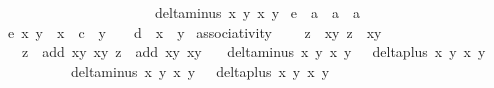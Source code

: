 \begin{isabellebody}
\ \ \ \ \ \ \ \ \ \ \ \ \ \ \ \ \ \ \ \ \ \ {\isacharparenleft}delta{\isacharunderscore}minus\ x{}\ y{}\ x{}\ y{}{\isacharparenright}{\isachardoublequoteclose}\isanewline
\isanewline
{}\isamarkupfalse%
\ e\ {\isacharcolon}{\isacharcolon}\ {\isachardoublequoteopen}{\isacharprime}a\ {\isasymRightarrow}\ {\isacharprime}a\ {\isasymRightarrow}\ {\isacharprime}a{\isachardoublequoteclose}\ \isanewline
\ {\isachardoublequoteopen}e\ x\ y\ {\isacharequal}\ x{\isacharcircum}{}\ {\isacharplus}\ c\ {\isacharasterisk}\ y{\isacharcircum}{}\ {\isacharminus}\ {}\ {\isacharminus}\ d\ {\isacharasterisk}\ x{\isacharcircum}{}\ {\isacharasterisk}\ y{\isacharcircum}{}{\isachardoublequoteclose}\isanewline
\isanewline
{}\isamarkupfalse%
\ associativity{\isacharcolon}\ \isanewline
\ \ \ {\isachardoublequoteopen}z{}{\isacharprime}\ {\isacharequal}\ {\isacharparenleft}x{}{\isacharprime}{\isacharcomma}y{}{\isacharprime}{\isacharparenright}{\isachardoublequoteclose}\ {\isachardoublequoteopen}z{}{\isacharprime}\ {\isacharequal}\ {\isacharparenleft}x{}{\isacharprime}{\isacharcomma}y{}{\isacharprime}{\isacharparenright}{\isachardoublequoteclose}\isanewline
\ \ \ {\isachardoublequoteopen}z{}{\isacharprime}\ {\isacharequal}\ add\ {\isacharparenleft}x{}{\isacharcomma}y{}{\isacharparenright}\ {\isacharparenleft}x{}{\isacharcomma}y{}{\isacharparenright}{\isachardoublequoteclose}\ {\isachardoublequoteopen}z{}{\isacharprime}\ {\isacharequal}\ add\ {\isacharparenleft}x{}{\isacharcomma}y{}{\isacharparenright}\ {\isacharparenleft}x{}{\isacharcomma}y{}{\isacharparenright}{\isachardoublequoteclose}\isanewline
\ \ \ {\isachardoublequoteopen}delta{\isacharunderscore}minus\ x{}\ y{}\ x{}\ y{}\ {\isasymnoteq}\ {}{\isachardoublequoteclose}\ {\isachardoublequoteopen}delta{\isacharunderscore}plus\ x{}\ y{}\ x{}\ y{}\ {\isasymnoteq}\ {}{\isachardoublequoteclose}\isanewline
\ \ \ \ \ \ \ \ \ \ {\isachardoublequoteopen}delta{\isacharunderscore}minus\ x{}\ y{}\ x{}\ y{}\ {\isasymnoteq}\ {}{\isachardoublequoteclose}\ {\isachardoublequoteopen}delta{\isacharunderscore}plus\ x{}\ y{}\ x{}\ y{}\ {\isasymnoteq}\ {}{\isachardoublequoteclose}\isanewline

\end{isabellebody}

